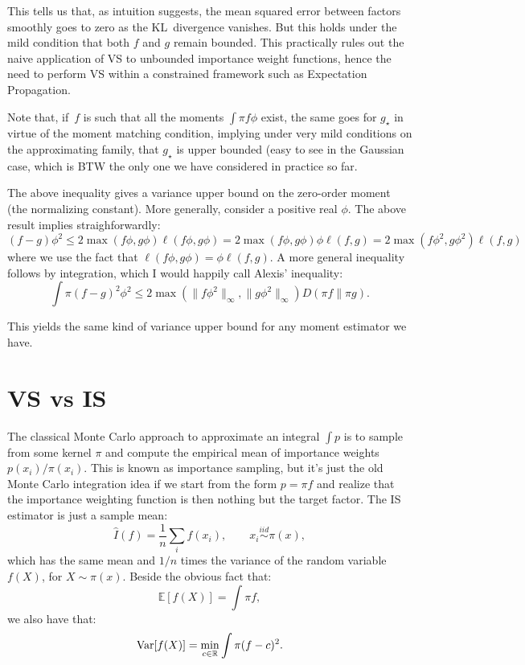 \documentclass{article}
\begin{document}
This tells us that, as intuition suggests, the mean squared error between factors smoothly goes to zero as the KL~divergence vanishes. But this holds under the mild condition that both $f$ and $g$ remain bounded. This practically rules out the naive application of VS to unbounded importance weight functions, hence the need to perform VS within a constrained framework such as Expectation Propagation.

Note that, if~$f$ is such that all the moments $\int\pi f \phi$ exist, the same goes for $g_\star$ in virtue of the moment matching condition, implying under very mild conditions on the approximating family, that $g_\star$ is upper bounded (easy to see in the Gaussian case, which is BTW the only one we have considered in practice so far.

The above inequality gives a variance upper bound on the zero-order moment (the normalizing constant). More generally, consider a positive real $\phi$. The above result implies straighforwardly:
$$
(f-g)\phi^2
\leq 2 \max(f\phi, g\phi) \ell(f\phi, g\phi)
= 2 \max(f\phi, g\phi) \phi\ell(f, g)
= 2 \max(f\phi^2, g\phi^2) \ell(f, g)
$$
where we use the fact that $\ell(f\phi,g\phi)=\phi\ell(f,g)$. A more general inequality follows by integration, which I would happily call Alexis' inequality:
$$
\int \pi (f-g)^2\phi^2 \leq 2\max(\|f\phi^2\|_\infty, \|g\phi^2\|_\infty) D(\pi f\|\pi g).
$$

This yields the same kind of variance upper bound for any moment estimator we have.


\section{VS vs IS}

The classical Monte Carlo approach to approximate an integral $\int p$ is to sample from some kernel $\pi$ and compute the empirical mean of importance weights $p(x_i)/\pi(x_i)$. This is known as importance sampling, but it's just the old Monte Carlo integration idea if we start from the form $p=\pi f$ and realize that the importance weighting function is then nothing but the target factor. The IS estimator is just a sample mean:
$$
\hat{I}(f) = \frac{1}{n}\sum_i f(x_i),
\qquad x_i \stackrel{iid}{\sim} \pi(x),
$$
which has the same mean and $1/n$ times the variance of the random variable $f(X)$, for $X\sim\pi(x)$. Beside the obvious fact that:
$$
\mathbb{E}[f(X)] = \int\pi f,
$$
we also have that:
$$
{\rm Var}[f(X)]
= \min_{c\in\mathbb{R}} \int \pi (f - c)^2.
$$
\end{document}
